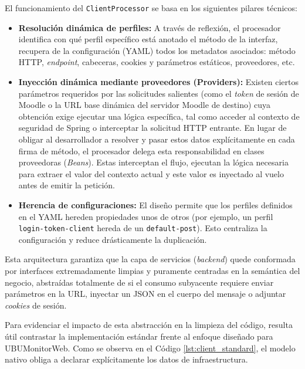 El funcionamiento del \texttt{ClientProcessor} se basa en los siguientes pilares técnicos:
\begin{itemize}
    \item \textbf{Resolución dinámica de perfiles:} A través de reflexión, el procesador identifica con qué perfil específico está anotado el método de la interfaz, recupera de la configuración (YAML) todos los metadatos asociados: método HTTP, \textit{endpoint}, cabeceras, cookies y parámetros estáticos, proveedores, etc.
    
    \item \textbf{Inyección dinámica mediante proveedores (Providers):} Existen ciertos parámetros requeridos por las solicitudes salientes (como el \textit{token} de sesión de Moodle o la URL base dinámica del servidor Moodle de destino) cuya obtención exige ejecutar una lógica específica, tal como acceder al contexto de seguridad de Spring o interceptar la solicitud HTTP entrante. En lugar de obligar al desarrollador a resolver y pasar estos datos explícitamente en cada firma de método, el procesador delega esta responsabilidad en clases proveedoras (\textit{Beans}). Estas interceptan el flujo, ejecutan la lógica necesaria para extraer el valor del contexto actual y este valor es inyectado al vuelo antes de emitir la petición.

    \item \textbf{Herencia de configuraciones:} El diseño permite que los perfiles definidos en el YAML hereden propiedades unos de otros (por ejemplo, un perfil \texttt{login-token-client} hereda de un \texttt{default-post}). Esto centraliza la configuración y reduce drásticamente la duplicación.
\end{itemize}

Esta arquitectura garantiza que la capa de servicios (\textit{backend}) quede conformada por interfaces extremadamente limpias y puramente centradas en la semántica del negocio, abstraídas totalmente de si el consumo subyacente requiere enviar parámetros en la URL, inyectar un JSON en el cuerpo del mensaje o adjuntar \textit{cookies} de sesión.

Para evidenciar el impacto de esta abstracción en la limpieza del código, resulta útil contrastar la implementación estándar frente al enfoque diseñado para UBUMonitorWeb. Como se observa en el Código \ref{lst:client_standard}, el modelo nativo obliga a declarar explícitamente los datos de infraestructura.

\begin{listing}[htbp]
    \centering
    \inputminted[frame=lines, fontsize=\small]{kotlin}{src/client-processor-1.kt}
    \caption{Interfaz de cliente HTTP estándar con alto acoplamiento.}
    \label{lst:client_standard}
\end{listing}

